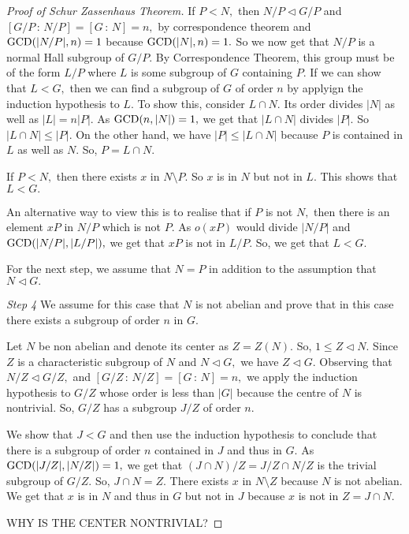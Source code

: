 \begin{proof}[Proof of Schur Zassenhaus Theorem]
	If $ P < N,$ then 
	$N /P \triangleleft G / P$ and $ [ G/P \, : \, N /P] =
	[ G \, : \, N ] =n,$
	by correspondence theorem and $ \operatorname{GCD}( \lvert N/P \rvert, n) = 1$ because 
	$\operatorname{GCD}( \lvert N \rvert, n) = 1.$ So we now get that
	$N/ P$ is a normal Hall subgroup of $G/P.$ By Correspondence
	Theorem, this group must be of the form $L/P$ where $L$ is some
	subgroup of $G$ containing $P.$ If we can show that $ L < G,$
	then we can find a subgroup of $G$ of order $n$ by 
	applyign the induction hypothesis to $L.$
	To show this, consider 
	$L \cap N.$ Its order divides $ \lvert N \rvert$ as well
	as $ \lvert L \rvert = n \lvert P \rvert.$ As $\operatorname{GCD}(n, \lvert 
	N \rvert) = 1,$ we get that $ \lvert L \cap N \rvert $ divides
	$ \lvert P \rvert.$ So $ \lvert L \cap N \rvert \leq \lvert P \rvert.$
	On the other hand, we have $ \lvert P \rvert \leq
	\lvert L \cap N \rvert$ because $P$ is contained in $L$ as well
	as $N.$ So, $P = L \cap N.$

	If $P <N,$ then
	there exists $x$ in $ N \setminus P.$ So $x$ is in $N$ but not
	in $L.$ This shows that $L < G.$

	An alternative way to view this is to realise that if $P$
	is not $N,$ then there is an element $xP$ in $N/P$ which is not
	$P.$ As $o(xP)$ would divide $ \lvert N /P \rvert$ and 
	$\operatorname{GCD}( \lvert N/P \rvert, \lvert L/P \rvert),$ we get that
	$xP$ is not in $L/P.$ So, we get that $L < G.$
	
	For the next step, we assume that $N=P$ in addition to the 
	assumption that $N \triangleleft G.$

	\emph{Step 4} \quad We assume for this case that $N$ is not
	abelian and prove that in this case there exists a subgroup of
	order $n$ in $G.$

	Let $N$ be non abelian and denote its center as $Z = Z(N).$
	So, $ 1 \leq Z \triangleleft N.$ Since $Z$ is a characteristic
	subgroup of $N$ and $N \triangleleft G,$ we have $Z \triangleleft G.$ Observing that $ N/Z \triangleleft G/Z,$ and 
	$[G/Z \,:\, N / Z] = [G \,:\, N] = n,$ we apply the induction
	hypothesis to $G/Z$ whose order is less than $ \lvert G \rvert$
	because the centre of $N$ is nontrivial. So, $G/Z$ has
	a subgroup $J/Z$ of order $n.$

	We show that $J<G$ and then use the induction hypothesis to 
	conclude that there is a subgroup of order $n$ contained in
	$J$ and thus in $G.$ As $\operatorname{GCD}( \lvert J/Z \rvert, \lvert N
	/Z \rvert ) = 1,$ we get that $ (J \cap N) / Z = 
	J/Z \cap N/Z$ is the trivial subgroup of $G/Z.$ 
	So, $J \cap N = Z.$ There exists $x$ in $N \setminus Z$
	because $N$ is not abelian. We get that $x$ is in $N$ and 
	thus in $G$ but not in $J$
	because $x$ is not in $Z = J \cap N.$
	
	WHY IS THE CENTER NONTRIVIAL?
\end{proof}


